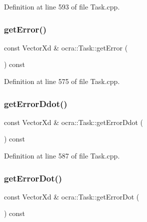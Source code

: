 Definition at line 593 of file Task.\+cpp.

\hypertarget{classocra_1_1Task_a3999ed88dfb201e364ee91b49f609405}{}\label{classocra_1_1Task_a3999ed88dfb201e364ee91b49f609405} 
\subsubsection{\texorpdfstring{get\+Error()}{getError()}}
{\footnotesize\ttfamily const Vector\+Xd \& ocra\+::\+Task\+::get\+Error (\begin{DoxyParamCaption}{ }\end{DoxyParamCaption}) const}



Definition at line 575 of file Task.\+cpp.

\hypertarget{classocra_1_1Task_a3811e23ef354c6aea47f269f850d8e69}{}\label{classocra_1_1Task_a3811e23ef354c6aea47f269f850d8e69} 
\subsubsection{\texorpdfstring{get\+Error\+Ddot()}{getErrorDdot()}}
{\footnotesize\ttfamily const Vector\+Xd \& ocra\+::\+Task\+::get\+Error\+Ddot (\begin{DoxyParamCaption}{ }\end{DoxyParamCaption}) const}



Definition at line 587 of file Task.\+cpp.

\hypertarget{classocra_1_1Task_a2f3a57806fc7ca1b539f71a49a14d58b}{}\label{classocra_1_1Task_a2f3a57806fc7ca1b539f71a49a14d58b} 
\subsubsection{\texorpdfstring{get\+Error\+Dot()}{getErrorDot()}}
{\footnotesize\ttfamily const Vector\+Xd \& ocra\+::\+Task\+::get\+Error\+Dot (\begin{DoxyParamCaption}{ }\end{DoxyParamCaption}) const}



